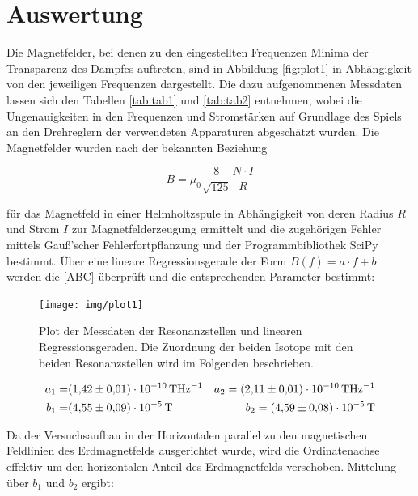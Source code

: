 \section{Auswertung}
\label{sec:Auswertung}

Die Magnetfelder, bei denen zu den eingestellten Frequenzen Minima der Transparenz des Dampfes auftreten, sind in Abbildung \eqref{fig:plot1} in Abhängigkeit von den jeweiligen Frequenzen dargestellt. Die dazu aufgenommenen Messdaten lassen sich den Tabellen \ref{tab:tab1} und \ref{tab:tab2} entnehmen, wobei die Ungenauigkeiten in den Frequenzen und Stromstärken auf Grundlage des Spiels an den Drehreglern der verwendeten Apparaturen abgeschätzt wurden. Die Magnetfelder wurden nach der bekannten Beziehung 

\begin{equation}
	B = \mu_0 \frac{8}{\sqrt{125}} \frac{N \cdot I}{R}
	\label{helm}
\end{equation}

für das Magnetfeld in einer Helmholtzspule in Abhängigkeit von deren Radius $R$ und Strom $I$ zur Magnetfelderzeugung  ermittelt und die zugehörigen Fehler mittels Gauß'scher Fehlerfortpflanzung und der Programmbibliothek SciPy \cite{SciPy} bestimmt. Über eine lineare Regressionsgerade der Form $B(f) = a \cdot f + b$ werden die \eqref{ABC} überprüft und die entsprechenden Parameter bestimmt:

\begin{figure}
	\centering
	\caption{Plot der Messdaten der Resonanzstellen und linearen Regressionsgeraden. Die Zuordnung der beiden Isotope mit den beiden Resonanzstellen wird im Folgenden beschrieben.}
	\texttt{[image: img/plot1]}
	\label{fig:plot1}
\end{figure}





\begin{eqnarray}
	a_1 =& \SI{1.42 \pm 0.01 e-10}{\tesla \hertz^{-1}} &a_2 =  \SI{2.11 \pm 0.01 e-10}{\tesla \hertz^{-1}}\\
	b_1 =& \SI{4.55 \pm 0.09 e-5}{\tesla}  &b_2 = \SI{4.59 \pm 0.08 e-5}{\tesla} 
\end{eqnarray}

Da der Versuchsaufbau in der Horizontalen parallel zu den magnetischen Feldlinien des Erdmagnetfelds ausgerichtet wurde, wird die Ordinatenachse effektiv um den horizontalen Anteil des Erdmagnetfelds verschoben. Mittelung über $b_1$ und $b_2$ ergibt:

